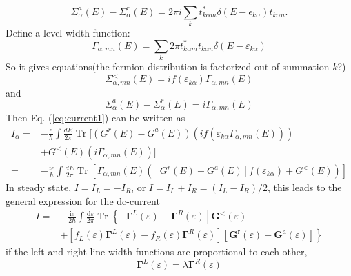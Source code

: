 \documentclass[aps,prb,superscriptaddress]{revtex4-2}
\begin{document}
\begin{equation}
\Sigma_{\alpha}^{a}(E)-\Sigma_{\alpha}^{r}(E) = 2\pi i\sum_{k}t_{k\alpha m}^{*}\delta(E-\epsilon_{k\alpha})t_{k\alpha n}.
\end{equation}
Define a level-width function:
\begin{equation}
\Gamma_{\alpha,mn}(E)=\sum_{k} 2 \pi  t_{k\alpha m}^{*}t_{k\alpha n} \delta\left(E-\varepsilon_{k\alpha}\right)
\end{equation}
So it gives equations(the fermion distribution is factorized out of summation $k$?)
\begin{equation}
\Sigma_{\alpha,mn}^{<}(E) = if(\varepsilon_{k\alpha})\Gamma_{\alpha,mn}(E)
\end{equation}
and
\begin{equation}
\Sigma_{\alpha}^{a}(E)-\Sigma_{\alpha}^{r}(E) = i\Gamma_{\alpha,mn}(E)
\end{equation}
Then Eq. (\ref{eq:current1}) can be written as
\begin{equation}
\begin{aligned}
I_{\alpha} =&-\frac{e}{\hbar} \int \frac{d E}{2 \pi} \operatorname{Tr}[\left(G^{r}(E)-G^{a}(E)\right) (if(\varepsilon_{k\alpha}\Gamma_{\alpha,mn}(E)))\\
&+G^{<}(E)(i\Gamma_{\alpha,mn}(E))]\\
=& -\frac{ie}{\hbar} \int \frac{d E}{2 \pi} \operatorname{Tr}\left[\Gamma_{\alpha,mn}(E)(\left[G^{r}(E)-G^{a}(E)\right] f(\varepsilon_{k\alpha}) +G^{<}(E))\right]
\end{aligned}
\label{eq:dc-current}
\end{equation}
In steady state, $I=I_{L}=-I_{R}$, or $I=I_{L}+I_{R}=(I_{L}-I_{R})/2$, this leads to the general expression for the dc-current
\begin{equation}
\begin{aligned}
I=& -\frac{\mathrm{i} e}{2 \hbar} \int \frac{\mathrm{d} \varepsilon}{2 \pi} \operatorname{Tr}\left\{\left[\boldsymbol{\Gamma}^{L}(\varepsilon)-\boldsymbol{\Gamma}^{R}(\varepsilon)\right] \mathbf{G}^{<}(\varepsilon)\right.\\
&\left.+\left[f_{L}(\varepsilon) \boldsymbol{\Gamma}^{L}(\varepsilon)-f_{R}(\varepsilon) \boldsymbol{\Gamma}^{R}(\varepsilon)\right]\left[\mathbf{G}^{\mathrm{r}}(\varepsilon)-\mathbf{G}^{\mathrm{a}}(\varepsilon)\right]\right\}
\end{aligned}
\end{equation}
if the left and right line-width functions are proportional to each other,
\begin{equation}
\boldsymbol{\Gamma}^{L}(\varepsilon)=\lambda \boldsymbol{\Gamma}^{R}(\varepsilon)
\end{equation}
\end{document}
